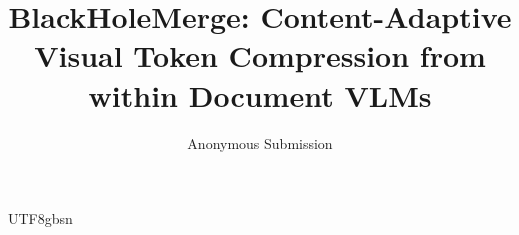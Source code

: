 \documentclass[letterpaper]{article} %
\title{BlackHoleMerge: Content-Adaptive Visual Token Compression from within Document VLMs}
\author{
    Anonymous Submission
}
\begin{document}
\begin{CJK}{UTF8}{gbsn}

\maketitle








\clearpage
{
    \small
    
}
\end{CJK}
\end{document}
